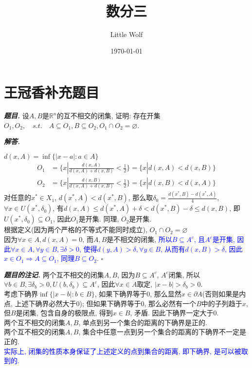 \documentclass[10pt, a4paper, oneside]{ctexart}
\title{\textbf{数分三}}
\author{Little Wolf}
\date{\today}
\newenvironment{problem}{\begin{framed}\par\noindent\textbf{\textit{题目. }}}{\end{framed}\par}
\newenvironment{solution}{%
  \par\noindent\textbf{\textit{解答. }}\ignorespaces
}{%
  \hfill\ensuremath{\square}\par %
}
\newenvironment{note}{\par\noindent\textbf{\textit{题目的注记. }}\ignorespaces}{\par}
\begin{document}
\maketitle

\tableofcontents
\newpage

\section{王冠香补充题目}
\begin{problem}
    设$A,B$是$\mathbb{R}^n$的互不相交的闭集, 证明: 存在开集$O_1,O_2, \quad s.t.\quad A\subseteq O_1, B\subseteq O_2, O_1\cap O_2 = \varnothing$.
\end{problem}

\begin{solution}
    $d(x,A)=\inf\{|x-a|:a\in A\}$
\begin{align*}
    O_1&=\{x|\frac{d(x,A)}{d(x,A)+d(x,B)}<\frac{1}{2}\}=\{x|d(x,A)<d(x,B)\}\\
    O_2&=\{x|\frac{d(x,B)}{d(x,A)+d(x,B)}<\frac{1}{2}\}=\{x|d(x,B)<d(x,A)\}
\end{align*}
对任意的$x^*\in X_1$, $d(x^*,A)<d(x^*,B)$, 那么取$\delta_0=\frac{d(x^*,B)-d(x^*,A)}{4}$, $\forall x\in U(x^*,\delta_0)$, 有$d(x,A)\leq d(x^*,A)+\delta < d(x^*,B)-\delta\leq d(x,B)$, 即$U(x^*,\delta_0)\subseteq O_1$, 因此$O_1$是开集. 同理, $O_2$是开集.\\
根据定义(因为两个严格的不等式不能同时成立), $O_1\cap O_2=\varnothing$\\
因为$\forall x\in A, d(x,A)=0$, 而$A,B$是不相交的闭集, \textcolor{blue}{所以$B\subseteq A^c$, 且$A^c$是开集, 因此$\forall x\in A, \forall y\in B, \exists  \delta>0$, 使得$d(y,A)>\delta, \forall y\in B$, 从而有$d(x,B)>\delta$, 因此$x\in O_1\Rightarrow A\subseteq O_1$, 同理$B\subseteq O_2$}.
\end{solution}
\begin{note}
两个互不相交的闭集$A,B$, 因为$B\subseteq A^c$, $A^c$闭集, 所以$\forall b\in B, \exists \delta_b>0, U(b,\delta_b)\subseteq A^c$, 因此$\forall x\in A$取定, $|x-b|>\delta_b>0$.\\
考虑下确界$\inf\{|x-b|:b\in B\}$, 如果下确界等于$0$, 那么显然$x\in \partial A$(否则如果是内点, 上述下确界必然大于$0$); 但如果下确界等于$0$, 那么必然有一个$B$中的子列趋于$x$, 但$B$是闭集, 包含自身的极限点, 得到$x\in B$, 矛盾. 因此下确界一定大于$0$.\\ 
两个互不相交的闭集$A,B$, 单点到另一个集合的距离的下确界是正的.\\
两个互不相交的闭集$A,B$, 集合中任意一点到另一个集合的距离的下确界不一定是正的.\\
\textcolor{blue}{实际上, 闭集的性质本身保证了上述定义的点到集合的距离, 即下确界, 是可以被取到的.}
\end{note}
\end{document}
